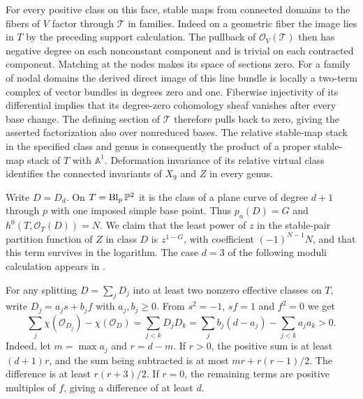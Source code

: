 For every positive class on this face, stable maps from connected domains to
the fibers of $V$ factor through $\mathcal T$ in families. Indeed on a
geometric fiber the image lies in $T$ by the preceding support calculation.
The pullback of $\mathcal O_V(\mathcal T)$ then has negative degree on
each nonconstant component and is trivial on each contracted component.
Matching at the nodes makes its space of sections zero. For a family of
nodal domains the derived direct image of this line bundle is locally a
two-term complex of vector bundles in degrees zero and one. Fiberwise
injectivity of its differential implies that its degree-zero cohomology
sheaf vanishes after every base change. The defining section of $\mathcal T$
therefore pulls back to zero, giving the asserted factorization also over
nonreduced bases. The relative stable-map stack in the specified class
and genus is consequently the product of a proper stable-map stack of $T$
with $\mathbb A^1$. Deformation invariance of its relative virtual class
identifies the connected invariants of $X_9$ and $Z$ in every genus.

Write $D=D_d$. On $T=\operatorname{Bl}_p\mathbb P^2$ it is the class of a plane
curve of degree $d+1$ through $p$ with one imposed simple base point.
Thus $p_a(D)=G$ and $h^0(T,\mathcal O_T(D))=N$. We claim that the least
power of $z$ in the stable-pair partition function of $Z$ in class $D$ is
$z^{1-G}$, with coefficient $(-1)^{N-1}N$, and that this term survives
in the logarithm. The case $d=3$ of the following moduli calculation appears
in \cite[Propositions~5.2--5.3]{WueCounter}.

For any splitting $D=\sum_j D_j$ into at least two nonzero effective classes
on $T$, write $D_j=a_js+b_jf$ with $a_j,b_j\ge0$. From
$s^2=-1$, $sf=1$ and $f^2=0$ we get
\[
 \sum_j\chi(\mathcal O_{D_j})-\chi(\mathcal O_D)
  =\sum_{j<k}D_jD_k
  =\sum_j b_j(d-a_j)-\sum_{j<k}a_ja_k>0.
\]
Indeed, let $m=\max a_j$ and $r=d-m$. If $r>0$, the positive sum is
at least $(d+1)r$, and the sum being subtracted is at most
$mr+r(r-1)/2$. The difference is at least $r(r+3)/2$.
If $r=0$, the remaining terms are positive multiples of $f$, giving a
difference of at least $d$.


